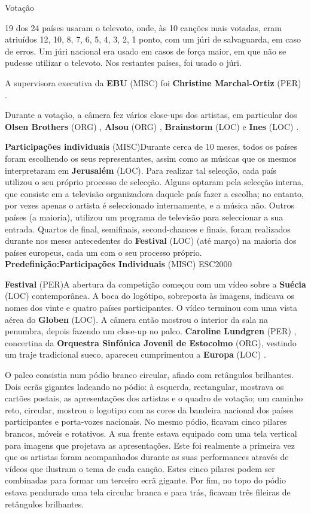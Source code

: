\documentclass[12pt,a4paper]{article}
\begin{document}
Votação

19 dos 24 países usaram o televoto, onde, às 10 canções mais votadas, eram atriuídos 12, 10, 8, 7, 6, 5, 4, 3, 2, 1 ponto, com um júri de salvaguarda, em caso de erros. Um júri nacional era usado em casos de força maior, em que não se pudesse utilizar o televoto. Nos restantes países, foi usado o júri.

A supervisora executiva da \textbf{EBU} (MISC) foi \textbf{Christine Marchal-Ortiz} (PER) .

Durante a votação, a câmera fez vários close-ups dos artistas, em particular dos \textbf{Olsen Brothers} (ORG) , \textbf{Alsou} (ORG) , \textbf{Brainstorm} (LOC) e \textbf{Ines} (LOC) .



\textbf{Participações individuais} (MISC)Durante cerca de 10 meses, todos os países foram escolhendo os seus representantes, assim como as músicas que os mesmos interpretaram em \textbf{Jerusalém} (LOC). Para realizar tal selecção, cada país utilizou o seu próprio processo de selecção. Alguns optaram pela selecção interna, que consiste em a televisão organizadora daquele país fazer a escolha; no entanto, por vezes apenas o artista é seleccionado internamente, e a música não. Outros países (a maioria), utilizou um programa de televisão para seleccionar a sua entrada. Quartos de final, semifinais, second-chances e finais, foram realizados durante nos meses antecedentes do \textbf{Festival} (LOC) (até março) na maioria dos países europeus, cada um com o seu processo próprio. \textbf{Predefinição:Participações Individuais} (MISC) ESC2000



\textbf{Festival} (PER)A abertura da competição começou com um vídeo sobre a \textbf{Suécia} (LOC) contemporânea. A boca do logótipo, sobreposta às imagens, indicava os nomes dos vinte e quatro países participantes. O vídeo terminou com uma vista aérea do \textbf{Globen} (LOC). A câmera então mostrou o interior da sala na penumbra, depois fazendo um close-up no palco. \textbf{Caroline Lundgren} (PER) , concertina da \textbf{Orquestra Sinfónica Jovenil de Estocolmo} (ORG), vestindo um traje tradicional sueco, apareceu cumprimentou a \textbf{Europa} (LOC) .

O palco consistia num pódio branco circular, afiado com retângulos brilhantes. Dois ecrãs gigantes ladeando no pódio: à esquerda, rectangular, mostrava os cartões postais, as apresentações dos artistas e o quadro de votação; um caminho reto, circular, mostrou o logotipo com as cores da bandeira nacional dos países participantes e porta-vozes nacionais. No mesmo pódio, ficavam cinco pilares brancos, móveis e rotativos. A sua frente estava equipado com uma tela vertical para imagens que projetava as apresentações. Este foi realmente a primeira vez que os artistas foram acompanhados durante as suas performances através de vídeos que ilustram o tema de cada canção. Estes cinco pilares podem ser combinadas para formar um terceiro ecrã gigante. Por fim, no topo do pódio estava pendurado uma tela circular branca e para trás, ficavam três fileiras de retângulos brilhantes.
\end{document}
